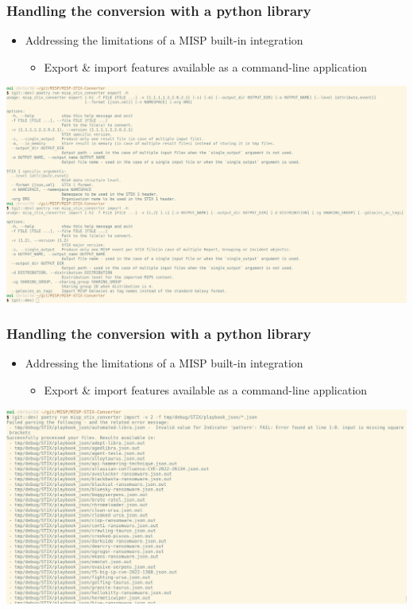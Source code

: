 \begin{frame}
    \frametitle{Handling the conversion with a python library}
    \begin{itemize}
        \item Addressing the limitations of a MISP built-in integration
        \begin{itemize}
            \item Export \& import features available as a command-line application
        \end{itemize}
    \end{itemize}
    \centering\includegraphics[scale=0.14]{images/command_line_help.png}
\end{frame}

\begin{frame}
    \frametitle{Handling the conversion with a python library}
    \begin{itemize}
        \item Addressing the limitations of a MISP built-in integration
        \begin{itemize}
            \item Export \& import features available as a command-line application
        \end{itemize}
    \end{itemize}
    \centering\includegraphics[scale=0.14]{images/stix_import_results.png}
\end{frame}

